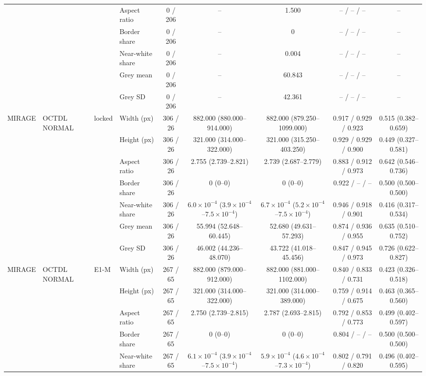 \begin{longtable}{@{}llllccccc@{}}
 &  &  & Aspect ratio & 0 / 206 & -- & 1.500 & -- / -- / -- & -- \\
 &  &  & Border share & 0 / 206 & -- & 0 & -- / -- / -- & -- \\
 &  &  & Near-white share & 0 / 206 & -- & 0.004 & -- / -- / -- & -- \\
 &  &  & Grey mean & 0 / 206 & -- & 60.843 & -- / -- / -- & -- \\
 &  &  & Grey SD & 0 / 206 & -- & 42.361 & -- / -- / -- & -- \\
\addlinespace[1pt]
MIRAGE & OCTDL NORMAL & locked & Width (px) & 306 / 26 & 882.000 (880.000--914.000) & 882.000 (879.250--1099.000) & 0.917 / 0.929 / 0.923 & 0.515 (0.382--0.659) \\
 &  &  & Height (px) & 306 / 26 & 321.000 (314.000--322.000) & 321.000 (315.250--403.250) & 0.929 / 0.929 / 0.900 & 0.449 (0.327--0.581) \\
 &  &  & Aspect ratio & 306 / 26 & 2.755 (2.739--2.821) & 2.739 (2.687--2.779) & 0.883 / 0.912 / 0.973 & 0.642 (0.546--0.736) \\
 &  &  & Border share & 306 / 26 & 0 (0--0) & 0 (0--0) & 0.922 / -- / -- & 0.500 (0.500--0.500) \\
 &  &  & Near-white share & 306 / 26 & $6.0\times10^{-4}$ ($3.9\times10^{-4}$--$7.5\times10^{-4}$) & $6.7\times10^{-4}$ ($5.2\times10^{-4}$--$7.5\times10^{-4}$) & 0.946 / 0.918 / 0.901 & 0.416 (0.317--0.534) \\
 &  &  & Grey mean & 306 / 26 & 55.994 (52.648--60.445) & 52.680 (49.631--57.293) & 0.874 / 0.936 / 0.955 & 0.635 (0.510--0.752) \\
 &  &  & Grey SD & 306 / 26 & 46.002 (44.236--48.070) & 43.722 (41.018--45.456) & 0.847 / 0.945 / 0.973 & 0.726 (0.622--0.827) \\
\addlinespace[1pt]
MIRAGE & OCTDL NORMAL & E1-M & Width (px) & 267 / 65 & 882.000 (879.000--912.000) & 882.000 (881.000--1102.000) & 0.840 / 0.833 / 0.731 & 0.423 (0.326--0.518) \\
 &  &  & Height (px) & 267 / 65 & 321.000 (314.000--322.000) & 321.000 (314.000--389.000) & 0.759 / 0.914 / 0.675 & 0.463 (0.365--0.560) \\
 &  &  & Aspect ratio & 267 / 65 & 2.750 (2.739--2.815) & 2.787 (2.693--2.815) & 0.792 / 0.853 / 0.773 & 0.499 (0.402--0.597) \\
 &  &  & Border share & 267 / 65 & 0 (0--0) & 0 (0--0) & 0.804 / -- / -- & 0.500 (0.500--0.500) \\
 &  &  & Near-white share & 267 / 65 & $6.1\times10^{-4}$ ($3.9\times10^{-4}$--$7.5\times10^{-4}$) & $5.9\times10^{-4}$ ($4.6\times10^{-4}$--$7.3\times10^{-4}$) & 0.802 / 0.791 / 0.820 & 0.496 (0.402--0.595) \\

\end{longtable}
